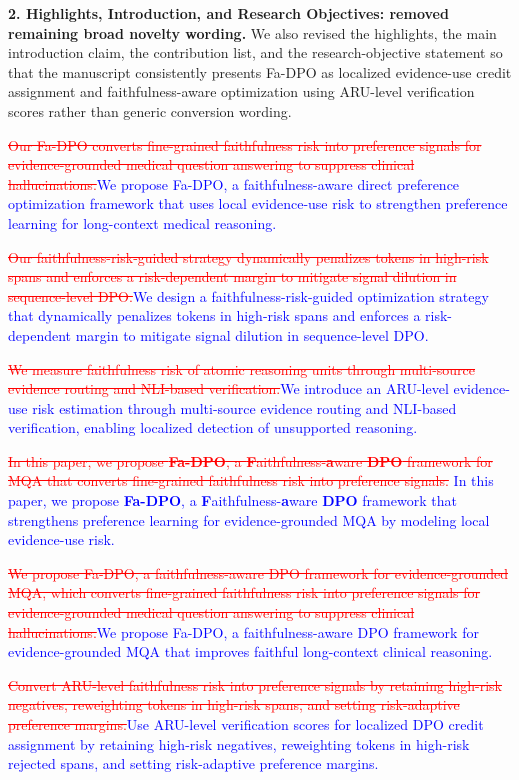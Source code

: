 \documentclass[12pt]{article}
\newcommand{\deleted}[1]{\textcolor{red}{\sout{#1}}}
\newcommand{\added}[1]{\textcolor{blue}{#1}}
\begin{document}
\textbf{2. Highlights, Introduction, and Research Objectives: removed remaining broad novelty wording.}
We also revised the highlights, the main introduction claim, the contribution list, and
the research-objective statement
so that the manuscript consistently presents Fa-DPO as localized evidence-use credit
assignment and faithfulness-aware optimization using ARU-level verification scores
rather than generic conversion wording.

\begin{displayquote}
\deleted{Our Fa-DPO converts fine-grained faithfulness risk into preference signals for evidence-grounded medical question answering to suppress clinical hallucinations.}\added{We propose Fa-DPO, a faithfulness-aware direct preference optimization framework that uses local evidence-use risk to strengthen preference learning for long-context medical reasoning.}

\deleted{Our faithfulness-risk-guided strategy dynamically penalizes tokens in high-risk spans and enforces a risk-dependent margin to mitigate signal dilution in sequence-level DPO.}\added{We design a faithfulness-risk-guided optimization strategy that dynamically penalizes tokens in high-risk spans and enforces a risk-dependent margin to mitigate signal dilution in sequence-level DPO.}

\deleted{We measure faithfulness risk of atomic reasoning units through multi-source evidence routing and NLI-based verification.}\added{We introduce an ARU-level evidence-use risk estimation through multi-source evidence routing and NLI-based verification, enabling localized detection of unsupported reasoning.}

\deleted{In this paper, we propose \textbf{Fa-DPO}, a \textbf{F}aithfulness-\textbf{a}ware \textbf{DPO} framework for MQA that converts fine-grained faithfulness risk into preference signals.}
\added{In this paper, we propose \textbf{Fa-DPO}, a \textbf{F}aithfulness-\textbf{a}ware \textbf{DPO} framework that strengthens preference learning for evidence-grounded MQA by modeling local evidence-use risk.}

\deleted{We propose Fa-DPO, a faithfulness-aware DPO framework for evidence-grounded MQA, which converts fine-grained faithfulness risk into preference signals for evidence-grounded medical question answering to suppress clinical hallucinations.}\added{We propose Fa-DPO, a faithfulness-aware DPO framework for evidence-grounded MQA that improves faithful long-context clinical reasoning.}

\deleted{Convert ARU-level faithfulness risk into preference signals by retaining high-risk negatives, reweighting tokens in high-risk spans, and setting risk-adaptive preference margins.}\added{Use ARU-level verification scores for localized DPO credit assignment by retaining high-risk negatives, reweighting tokens in high-risk rejected spans, and setting risk-adaptive preference margins.}
\end{displayquote}
\end{document}
